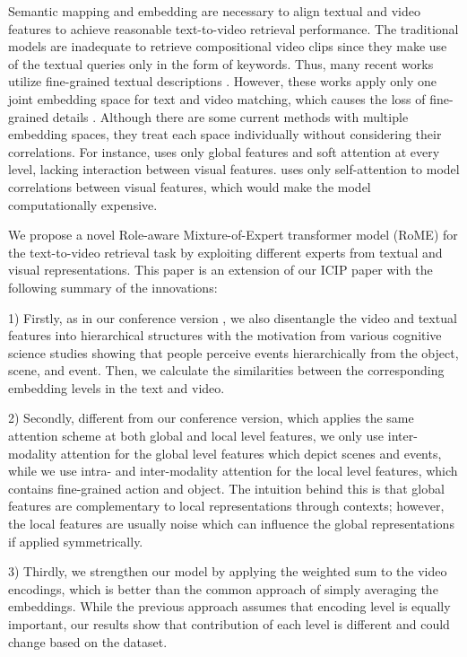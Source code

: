 \documentclass[lettersize,journal]{IEEEtran}
\begin{document}
Semantic mapping and embedding are necessary to align textual and video features to achieve reasonable text-to-video retrieval performance. The traditional models \cite{Chang2015SemanticCD, Habibian2014CompositeCD} are inadequate to retrieve compositional video clips since they make use of the textual queries only in the form of keywords. Thus, many recent works utilize fine-grained textual descriptions \cite{Chen_2020_CVPR, mithun2020, miech18learning,miech19howto100m, miech20endtoend}. However, these works apply only one joint embedding space for text and video matching, which causes the loss of fine-grained details \cite{Liu2019a, mithun2020, dong_cvpr19}. Although there are some current methods with multiple embedding spaces, they treat each space individually without considering their correlations. For instance, \cite{Chen_2020_CVPR} uses only global features and soft attention at every level, lacking interaction between visual features. \cite{gabeur2020mmt} uses only self-attention to model correlations between visual features, which would make the model computationally expensive.

We propose a novel Role-aware Mixture-of-Expert transformer model (RoME) for the text-to-video retrieval task by exploiting different experts from textual and visual representations. This paper is an extension of our ICIP paper \cite{satar_2021} with the following summary of the innovations: 

1) Firstly, as in our conference version \cite{satar_2021}, we also disentangle the video and textual features into hierarchical structures with the motivation from various cognitive science studies \cite{Christopher, Zacks2001PerceivingRA} showing that people perceive events hierarchically from the object, scene, and event. Then, we calculate the similarities between the corresponding embedding levels in the text and video.

2) Secondly, different from our conference version, which applies the same attention scheme at both global and local level features, we only use inter-modality attention for the global level features which depict scenes and events, while we use intra- and inter-modality attention for the local level features, which contains fine-grained action and object. The intuition behind this is that global features are complementary to local representations through contexts; however, the local features are usually noise which can influence the global representations if applied symmetrically. 

3) Thirdly, we strengthen our model by applying the weighted sum to the video encodings, which is better than the common approach of simply averaging the embeddings. While the previous approach assumes that encoding level is equally important, our results show that contribution of each level is different and could change based on the dataset.  
\end{document}
